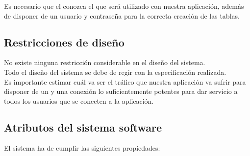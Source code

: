 Es necesario que el  conozca el  que será
utilizado con nuestra aplicación, además de disponer de un usuario y contraseña
para la correcta creación de las tablas.

\subsection{Restricciones de diseño}

No existe ninguna restricción considerable en el diseño del sistema.\\

Todo el diseño del sistema se debe de regir con la especificación
realizada.\\

Es importante estimar cuál va ser el tráfico que nuestra aplicación va sufrir
para disponer de un  y una conexión lo suficientemente
potentes para dar servicio a todos los usuarios que se conecten a la aplicación.

\subsection{Atributos del sistema software}
El sistema ha de cumplir las siguientes propiedades:

